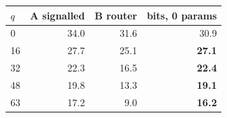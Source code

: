 \begin{tabular}{lrrr}
\toprule
$q$ & A signalled & B router & bits, 0 params \\
\midrule
0 & 34.0 & 31.6 & 30.9 \\
16 & 27.7 & 25.1 & \textbf{27.1} \\
32 & 22.3 & 16.5 & \textbf{22.4} \\
48 & 19.8 & 13.3 & \textbf{19.1} \\
63 & 17.2 & 9.0 & \textbf{16.2} \\
\bottomrule
\end{tabular}
